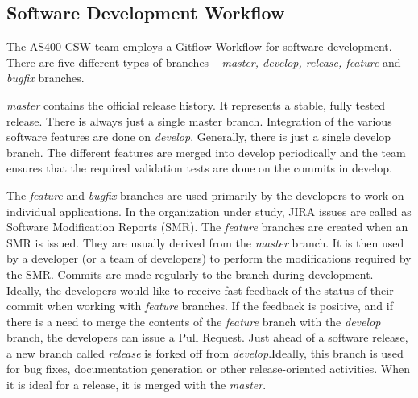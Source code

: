 \documentclass[12pt, a4paper, titlepage]{scrartcl}
\newcommand{\courierword}[1]{\textsf{\itshape #1}}{\fontfamily{pcr}\selectfont}%
\begin{document}
\subsection{Software Development Workflow}
The AS400 CSW team employs a Gitflow Workflow\cite{GitflowWorkflow} for software development. There are five different types of branches – \courierword{master, develop, release, feature} and \courierword{bugfix} branches. 
\par \courierword{master} contains the official release history. It represents a stable, fully tested release. There is always just a single master branch. Integration of the various software features are done on \courierword{develop}. Generally, there is just a single develop branch. The different features are merged into develop periodically and the team ensures that the required validation tests are done on the commits in develop. 
\par The \courierword{feature} and \courierword{bugfix} branches are used primarily by the developers to work on individual applications. In the organization under study, JIRA issues are called as Software Modification Reports (SMR). The \courierword{feature} branches are created when an SMR is issued. They are usually derived from the \courierword{master} branch.  It is then used by a developer (or a team of developers) to perform the modifications required by the SMR. Commits are made regularly to the branch during development. Ideally, the developers would like to receive fast feedback of the status of their commit when working with \courierword{feature} branches. If the feedback is positive, and if there is a need to merge the contents of the \courierword{feature} branch with the \courierword{develop} branch, the developers can issue a Pull Request\cite{dabbish2012social}. Just ahead of a software release, a new branch called \courierword{release} is forked off from \courierword{develop}.Ideally, this branch is used for bug fixes, documentation generation or other release-oriented activities. When it is ideal for a release, it is merged with the \courierword{master}. 
\end{document}

